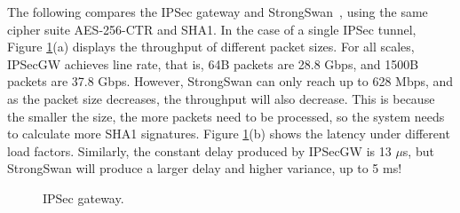 The following compares the IPSec gateway and StrongSwan~\cite{strongswan}, using the same cipher suite AES-256-CTR and SHA1. In the case of a single IPSec tunnel, Figure \ref{clicknp:fig:IPSec}(a) displays the throughput of different packet sizes. For all scales, IPSecGW achieves line rate, that is, 64B packets are 28.8 Gbps, and 1500B packets are 37.8 Gbps. However, StrongSwan can only reach up to 628 Mbps, and as the packet size decreases, the throughput will also decrease. This is because the smaller the size, the more packets need to be processed, so the system needs to calculate more SHA1 signatures. Figure \ref{clicknp:fig:IPSec}(b) shows the latency under different load factors. Similarly, the constant delay produced by IPSecGW is 13 $\mu$s, but StrongSwan will produce a larger delay and higher variance, up to 5 ms!

\begin{figure}[htbp]
	\centering
	
	\caption{IPSec gateway.}
	
	\label{clicknp:fig:IPSec}
\end{figure}

